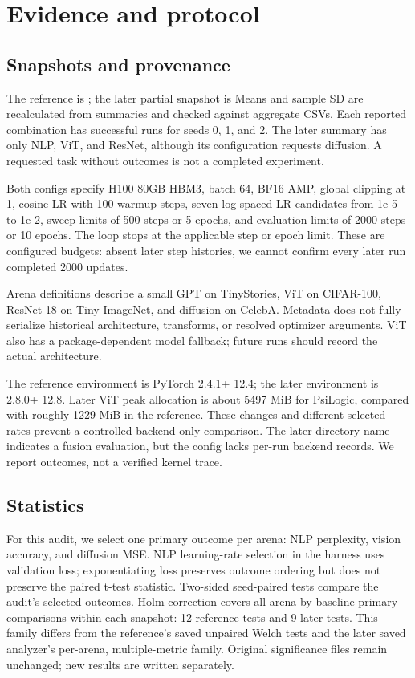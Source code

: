 \documentclass[11pt,a4paper]{article}
\begin{document}
\section{Evidence and protocol}

\subsection{Snapshots and provenance}

The reference is ; the later partial snapshot is  Means and sample SD are recalculated from summaries and checked against aggregate CSVs. Each reported combination has successful runs for seeds 0, 1, and 2. The later summary has only NLP, ViT, and ResNet, although its configuration requests diffusion. A requested task without outcomes is not a completed experiment.

Both configs specify H100 80GB HBM3, batch 64, BF16 AMP, global clipping at 1, cosine LR with 100 warmup steps, seven log-spaced LR candidates from 1e-5 to 1e-2, sweep limits of 500 steps or 5 epochs, and evaluation limits of 2000 steps or 10 epochs. The loop stops at the applicable step or epoch limit. These are configured budgets: absent later step histories, we cannot confirm every later run completed 2000 updates.

Arena definitions describe a small GPT on TinyStories, ViT on CIFAR-100, ResNet-18 on Tiny ImageNet, and  diffusion on CelebA. Metadata does not fully serialize historical architecture, transforms, or resolved optimizer arguments. ViT also has a package-dependent model fallback; future runs should record the actual architecture.

The reference environment is PyTorch 2.4.1+ 12.4; the later environment is 2.8.0+ 12.8. Later ViT peak allocation is about 5497 MiB for PsiLogic, compared with roughly 1229 MiB in the reference. These changes and different selected rates prevent a controlled backend-only comparison. The later directory name indicates a fusion evaluation, but the config lacks per-run backend records. We report outcomes, not a verified kernel trace.

\subsection{Statistics}

For this audit, we select one primary outcome per arena: NLP perplexity, vision accuracy, and diffusion MSE. NLP learning-rate selection in the harness uses validation loss; exponentiating loss preserves outcome ordering but does not preserve the paired t-test statistic. Two-sided seed-paired tests compare the audit's selected outcomes. Holm correction covers all arena-by-baseline primary comparisons within each snapshot: 12 reference tests and 9 later tests. This family differs from the reference's saved unpaired Welch tests and the later saved analyzer's per-arena, multiple-metric family. Original significance files remain unchanged; new results are written separately.
\end{document}
